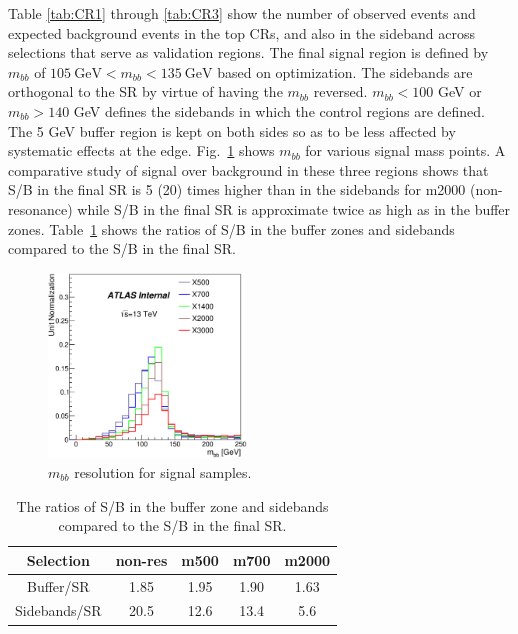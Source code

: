 Table \ref{tab:CR1} through \ref{tab:CR3} show the number of observed
events and expected background events in the top CRs, and also in the sideband across selections that serve as validation regions. The final signal region is defined by $m_{bb}$ of $105~\textrm{GeV} < m_{bb} < 135~\textrm{GeV}$ based on optimization. The sidebands are orthogonal to the SR by virtue of having the $m_{bb}$ reversed. $m_{bb} < 100$ GeV or $m_{bb} > 140$ GeV defines the sidebands in which the control regions are defined.  The 5 GeV buffer region is kept on both sides so as to be less affected by systematic effects at the edge. Fig.~\ref{fig:mbb_signal} shows $m_{bb}$ for various signal mass points. A comparative study of signal over background in these three regions shows that S/B in the final SR is 5 (20) times higher than in the sidebands for m2000 (non-resonance) while S/B in the final SR is approximate twice as high as in the buffer zones.  Table~\ref{tab:sigOverBkg} shows the ratios of S/B in the buffer zones and sidebands compared to the S/B in the final SR. \newline

\begin{figure}[!h]
\begin{center}
\includegraphics*[width=0.47\textwidth] {figures/bbMass_X500_X700_X1400_X2000_X3000.eps}
\caption[$m_{bb}$ resolution for signal and sum of backgrounds.]{$m_{bb}$ resolution for signal samples.}
\label{fig:mbb_signal}
\end{center}
\end{figure}

\begin{table}
\begin{center}
\begin{tabular}{c|c|c|c|c|}
Selection & non-res & m500 & m700 & m2000\\
\hline
Buffer/SR              	& 1.85 & 1.95  & 1.90 & 1.63\\
\hline
 Sidebands/SR	       & 20.5 & 12.6 & 13.4 & 5.6\\
\hline 
\end{tabular}
\caption[S/B ratios]{The ratios of S/B in the buffer zone and sidebands compared to the S/B in the final SR. } 
\label{tab:sigOverBkg}
\end{center}
\end{table}

